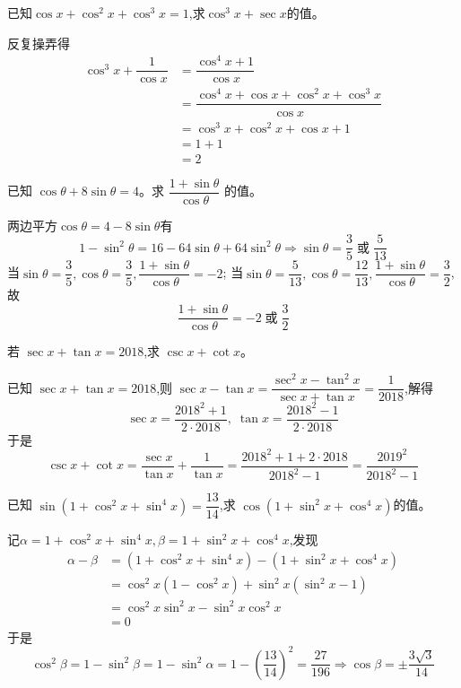 \begin{questions}
    \question 已知$\cos x+\cos^2 x+\cos^3x=1$,求$\cos^3 x+\sec x$的值。
    \begin{solution}
    反复操弄得 
    \begin{align*}
        \cos^3x+\dfrac{1}{\cos x}&=\dfrac{\cos^4x+1}{\cos x}\\
        &=\dfrac{\cos^4x+\cos x+\cos^2x+\cos^3x}{\cos x}\\
        &=\cos^3x+\cos^2x+\cos x+1\\
        &=1+1\\
        &=2
    \end{align*}
    \end{solution}
    \question 已知 \(\cos\theta + 8\sin\theta = 4\)。求 $\dfrac{1+\sin\theta}{\cos\theta}$ 的值。  
    \begin{solution}
        两边平方$\cos\theta =4- 8\sin\theta$有
        \[
        1-\sin^2 \theta=16-64\sin\theta+64\sin^2\theta \Rightarrow \sin \theta= \frac{3}{5}\; \text{或} \;\frac{5}{13}
        \]
        当$\sin \theta= \dfrac{3}{5},\cos \theta= \dfrac{3}{5},\dfrac{1+\sin\theta}{\cos\theta}=-2$;
        当$\sin \theta= \dfrac{5}{13},\cos \theta= \dfrac{12}{13},\dfrac{1+\sin\theta}{\cos\theta}=\dfrac{3}{2}$,故
        \[
        \dfrac{1+\sin\theta}{\cos\theta}=-2\;\text{或}\;\dfrac{3}{2}
        \]
    \end{solution}
    
    \question 若 \(\sec x + \tan x = 2018\),求 \(\csc x + \cot x\)。  
    \begin{solution}
        已知 \(\sec x + \tan x = 2018\),则 \(\sec x - \tan x =\dfrac{\sec^2 x - \tan^2 x}{\sec x + \tan x}= \dfrac{1}{2018}\),解得
        \[
        \sec x = \frac{2018^2+1}{2\cdot 2018},\; \tan x = \frac{2018^2-1}{2\cdot 2018}
        \]
        于是
        \[
        \csc x + \cot x=\frac{\sec x}{\tan x}+\frac{1}{\tan x}=\frac{2018^2+1+2\cdot2018}{2018^2-1}=\frac{2019^2}{2018^2-1}
        \]
    \end{solution}

    \question 已知 $\sin (1+\cos^2 x+\sin^4 x)=\dfrac{13}{14}$,求 $\cos (1+\sin^2 x+\cos^4 x)$的值。
    \begin{solution}
        记$\alpha=1+\cos^2 x+\sin^4 x, \beta=1+\sin^2 x+\cos^4 x$,发现
        \begin{align*}
        \alpha-\beta&=(1+\cos^2 x+\sin^4 x)-(1+\sin^2 x+\cos^4 x)\\
        &=\cos^2 x(1-\cos^2 x)+\sin^2 x(\sin^2 x-1)\\
        &=\cos^2 x\sin^2 x-\sin^2 x\cos^2 x\\
        &=0
        \end{align*}
        于是
        \[
        \cos^2 \beta = 1-\sin^2 \beta=1-\sin^2 \alpha= 1- \left(\frac{13}{14}\right)^2=\frac{27}{196} \Rightarrow \cos \beta=\pm \frac{3\sqrt3}{14}
        \]
    \end{solution}  


\end{questions}
